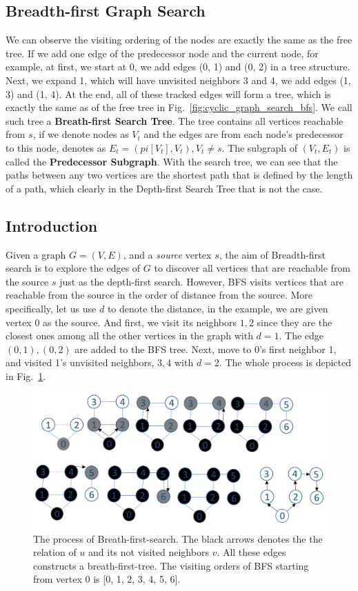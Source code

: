 \documentclass[main.tex]{subfiles}
\begin{document}
\subsection{Breadth-first Graph Search}
We can observe the visiting ordering of the nodes are exactly the same as the free tree. If we add one edge of the predecessor node and the current node, for example, at first, we start at 0, we add edges (0, 1) and (0, 2) in a tree structure. Next, we expand 1, which will have unvisited neighbors 3 and 4, we add edges (1, 3) and (1, 4). At the end, all of these tracked edges will form a tree, which is exactly the same as of the free tree in Fig.~\ref{fig:cyclic_graph_search_bfs}.  We call such tree a \textbf{Breath-first Search Tree}. The tree contains all vertices reachable from $s$, if we denote nodes as $V_t$ and the edges are from each node's predecessor to this node, denotes as $E_t = {(pi[V_t], V_t), V_t \neq s}$. The subgraph of $(V_t, E_t)$ is called the \textbf{Predecessor Subgraph}.  With the search tree, we can see that the paths between any two vertices are the shortest path that is defined by the length of a path, which clearly in the Depth-first Search Tree that is not the case. 
\subsection{Introduction} 
 Given a graph $G = (V, E)$, and a \textit{source} vertex $s$, the aim of Breadth-first search is to explore the edges of $G$ to discover all vertices that are reachable from the source $s$ just as the depth-first search. However, BFS visits vertices that are reachable from the source in the order of distance from the source. More specifically, let us use $d$ to denote the distance, in the example, we are given vertex $0$ as the source. And first, we visit its neighbors $1, 2$ since they are the closest ones among all the other vertices in the graph with $d=1$. The edge $(0, 1), (0, 2)$ are added to the BFS tree. Next, move to 0's first neighbor 1, and visited 1's unvisited neighbors, $3, 4$ with $d=2$.  The whole process is depicted in Fig.~\ref{fig:bfs_search}.  
 \begin{figure}[!ht]
    \centering
    \includegraphics[width=0.9\columnwidth]{fig/bfs_example_1.png}
    \caption{The process of Breath-first-search. The black arrows denotes the the relation of $u$ and its not visited neighbors $v$. All these edges constructs a breath-first-tree. The visiting orders of BFS starting from vertex $0$ is [0, 1, 2, 3, 4, 5, 6].}
    \label{fig:bfs_search}
\end{figure}
\end{document}
